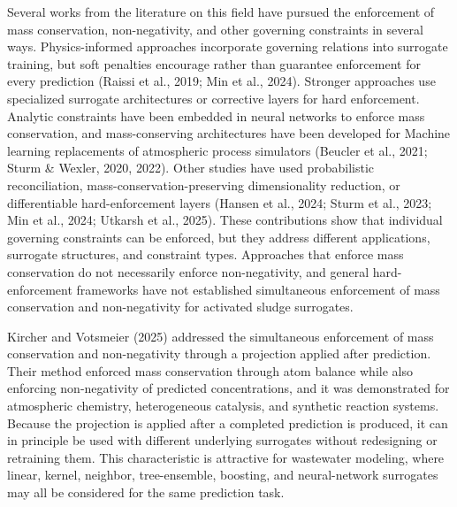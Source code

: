 \documentclass[a4paper,fleqn]{cas-sc}
\begin{document}
Several works from the literature on this field have pursued the enforcement of mass conservation, non-negativity, and other governing constraints in several ways. Physics-informed approaches incorporate governing relations into surrogate training, but soft penalties encourage rather than guarantee enforcement for every prediction (Raissi et al., 2019; Min et al., 2024). Stronger approaches use specialized surrogate architectures or corrective layers for hard enforcement. Analytic constraints have been embedded in neural networks to enforce mass conservation, and mass-conserving architectures have been developed for Machine learning replacements of atmospheric process simulators (Beucler et al., 2021; Sturm \& Wexler, 2020, 2022). Other studies have used probabilistic reconciliation, mass-conservation-preserving dimensionality reduction, or differentiable hard-enforcement layers (Hansen et al., 2024; Sturm et al., 2023; Min et al., 2024; Utkarsh et al., 2025). These contributions show that individual governing constraints can be enforced, but they address different applications, surrogate structures, and constraint types. Approaches that enforce mass conservation do not necessarily enforce non-negativity, and general hard-enforcement frameworks have not established simultaneous enforcement of mass conservation and non-negativity for activated sludge surrogates.

Kircher and Votsmeier (2025) addressed the simultaneous enforcement of mass conservation and non-negativity through a projection applied after prediction. Their method enforced mass conservation through atom balance while also enforcing non-negativity of predicted concentrations, and it was demonstrated for atmospheric chemistry, heterogeneous catalysis, and synthetic reaction systems. Because the projection is applied after a completed prediction is produced, it can in principle be used with different underlying surrogates without redesigning or retraining them. This characteristic is attractive for wastewater modeling, where linear, kernel, neighbor, tree-ensemble, boosting, and neural-network surrogates may all be considered for the same prediction task.
\end{document}
